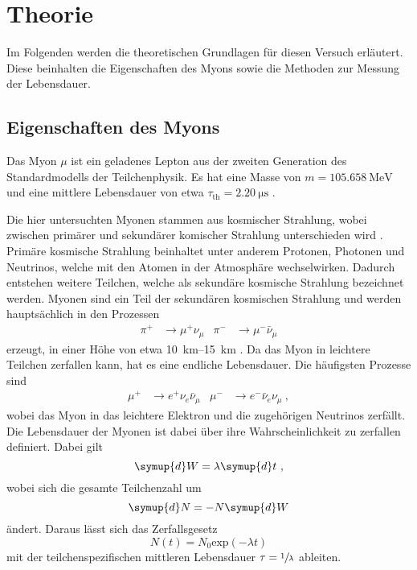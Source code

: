 \section{Theorie}
\label{sec:theorie}

Im Folgenden werden die theoretischen Grundlagen für diesen Versuch erläutert.
Diese beinhalten die Eigenschaften des Myons
sowie die Methoden zur Messung der Lebensdauer.


\subsection{Eigenschaften des Myons}

Das Myon $\mu$ ist ein geladenes Lepton aus der zweiten Generation des Standardmodells der Teilchenphysik.
Es hat eine Masse von $m = \SI{105.658}{\mega\eV}$ und eine mittlere Lebensdauer von etwa $\tau_\text{th} = \SI{2.20}{\micro\second}$ \cite{pdg}.

Die hier untersuchten Myonen stammen aus kosmischer Strahlung,
wobei zwischen primärer und sekundärer komischer Strahlung unterschieden wird \cite{grupen}.
Primäre kosmische Strahlung beinhaltet unter anderem Protonen,
Photonen und Neutrinos,
welche mit den Atomen in der Atmosphäre wechselwirken.
Dadurch entstehen weitere Teilchen,
welche als sekundäre kosmische Strahlung bezeichnet werden.
Myonen sind ein Teil der sekundären kosmischen Strahlung und werden hauptsächlich in den Prozessen
\begin{align*}
    \pi^{+} &\to \mu^{+}     \nu_{\mu} &
    \pi^{-} &\to \mu^{-} \bar\nu_{\mu}
\end{align*}
erzeugt,
in einer Höhe von etwa \SIrange{10}{15}{\kilo\meter} \cite{grupen}.
Da das Myon in leichtere Teilchen zerfallen kann,
hat es eine endliche Lebensdauer.
Die häufigsten Prozesse sind
\begin{align*}
    \mu^{+} &\to e^{+}     \nu_{e} \bar\nu_{\mu} &
    \mu^{-} &\to e^{-} \bar\nu_{e}     \nu_{\mu} \ ,
\end{align*}
wobei das Myon in das leichtere Elektron und die zugehörigen Neutrinos zerfällt.
Die Lebensdauer der Myonen ist dabei über ihre Wahrscheinlichkeit zu zerfallen definiert.
Dabei gilt
\begin{equation*}
    \symup{d}W = \lambda \symup{d}t \ ,
\end{equation*}
wobei sich die gesamte Teilchenzahl um
\begin{equation*}
    \symup{d}N = -N \symup{d}W
\end{equation*}
ändert.
Daraus lässt sich das Zerfallsgesetz
\begin{equation*}
    N(t) = N_0 \text{exp}(- \lambda t)
\end{equation*}
mit der teilchenspezifischen mittleren Lebensdauer $\tau = \sfrac{1}{\lambda}$ ableiten.


